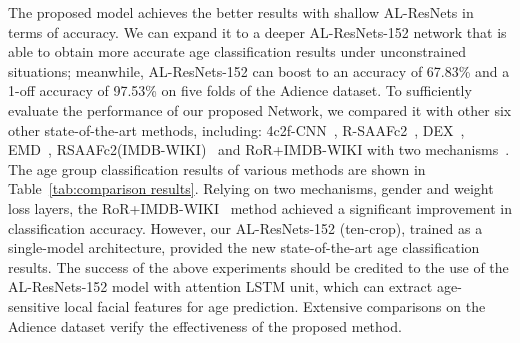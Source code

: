 \documentclass[journal]{IEEEtran}
\begin{document}
\par
The proposed model achieves the better results with shallow AL-ResNets in terms of accuracy. We can expand it to a deeper AL-ResNets-152 network that is able to obtain more accurate age classification results under unconstrained situations; meanwhile, AL-ResNets-152 can boost to an accuracy of 67.83\% and a 1-off accuracy of 97.53\% on five folds of the Adience dataset. To sufficiently evaluate the performance of our proposed Network, we compared it with other six other state-of-the-art methods, including:
4c2f-CNN~\cite{ref-16}, R-SAAFc2~\cite{ref-17}, DEX~\cite{ref-19}, EMD~\cite{ref-18}, RSAAFc2(IMDB-WIKI)~\cite{ref-21} and RoR+IMDB-WIKI with two mechanisms~\cite{ref-22}. The age group classification results of various methods are shown in Table~\ref{tab:comparison results}. Relying on two mechanisms, gender and weight loss layers, the RoR+IMDB-WIKI~\cite{ref-22} method achieved a significant improvement in classification accuracy. However, our AL-ResNets-152 (ten-crop), trained as a single-model architecture, provided the new state-of-the-art age classification results. The success of the above experiments should be credited to the use of the AL-ResNets-152 model with attention LSTM unit, which can extract age-sensitive local facial features for age prediction. Extensive comparisons on the Adience dataset verify the effectiveness of the proposed method.
\end{document}
